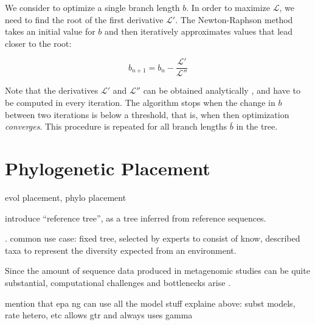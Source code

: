 We consider to optimize a single branch length $b$.
In order to maximize $\mathcal{L}$, we need to find the root of the first derivative $\mathcal{L}'$.
The Newton-Raphson method takes an initial value for $b$ and then
iteratively approximates values that lead closer to the root:

\begin{equation}
    \label{ch:Foundations:sec:MLTreeInference:eq:BLO}
    b_{n+1} = b_n - \frac{ \mathcal{L}' }{ \mathcal{L}'' }
\end{equation}

Note that the derivatives $\mathcal{L}'$ and $\mathcal{L}''$ can be obtained analytically \cite{Yang2014},
and have to be computed in every iteration.
The algorithm stops when the change in $b$ between two iterations is below a threshold,
that is, when then optimization \emph{converges}.
This procedure is repeated for all branch lengths $\bar{b}$ in the tree.


\section{Phylogenetic Placement}
\label{ch:Foundations:sec:PhylogeneticPlacement}

evol placement, phylo placement \cite{Matsen2010,Berger2011,Barbera2018}

introduce ``reference tree'', as a tree inferred from reference sequences.

. common use case: fixed tree, selected by experts to consist of know, described taxa
to represent the diversity expected from an environment.


Since the amount of sequence data produced in metagenomic studies can be quite substantial,
computational challenges and bottlenecks arise \cite{Scholz2012}.


mention that epa ng can use all the model stuff explaine above: subst models, rate hetero, etc
allows gtr and always uses gamma


